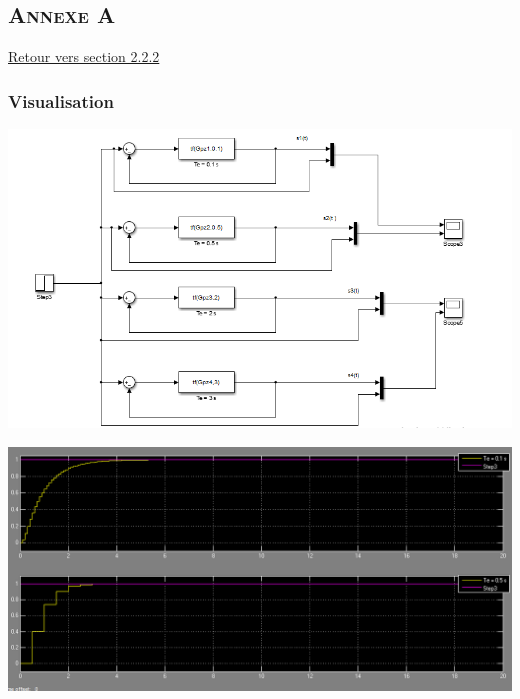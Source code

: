 
\begin{appendices}

\chapter*{\textsc{Annexe A}}
	
	\label{Annexe A} \hyperref[section 2.2.2]{Retour vers section 2.2.2}
	
	\subsection{Visualisation}

	\begin{center}
	\includegraphics[scale=0.5]{shem1.png}
	\label{fig4} 
	\end{center}
	
	\begin{center}
	\includegraphics[scale=0.4]{simu1.png}
	\label{fig5} 
	\end{center}
	

\end{appendices}
